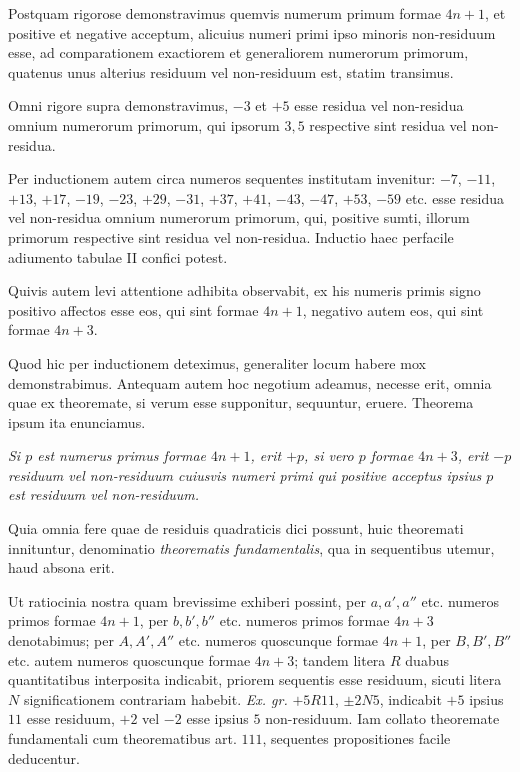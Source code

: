 
Postquam rigorose demonstravimus quemvis numerum primum formae $4n+1$, et positive et negative acceptum, alicuius numeri primi ipso minoris non-residuum esse, ad comparationem exactiorem et generaliorem numerorum primorum, quatenus unus alterius residuum vel non-residuum est, statim transimus.

Omni rigore supra demonstravimus, $-3$ et $+5$ esse residua vel non-residua omnium numerorum primorum, qui ipsorum $3, 5$ respective sint residua vel non-residua.

Per inductionem autem circa numeros sequentes institutam invenitur: $-7$, $-11$, $+13$, $+17$, $-19$, $-23$, $+29$, $-31$, $+37$, $+41$, $-43$, $-47$, $+53$, $-59$ etc. esse residua vel non-residua omnium numerorum primorum, qui, positive sumti, illorum primorum respective sint residua vel non-residua. Inductio haec perfacile adiumento tabulae II confici potest.

Quivis autem levi attentione adhibita observabit, ex his numeris primis signo positivo affectos esse eos, qui sint formae $4n+1$, negativo autem eos, qui sint formae $4n+3$.


Quod hic per inductionem deteximus, generaliter locum habere mox demonstrabimus. Antequam autem hoc negotium adeamus, necesse erit, omnia quae ex theoremate, si verum esse supponitur, sequuntur, eruere. Theorema ipsum ita enunciamus.

\emph{Si $p$ est numerus primus formae $4n+1$, erit $+p$, si vero $p$ formae $4n+3$, erit $-p$ residuum vel non-residuum cuiusvis numeri primi qui positive acceptus ipsius $p$ est residuum vel non-residuum.}

Quia omnia fere quae de residuis quadraticis dici possunt, huic theoremati innituntur, denominatio \emph{theorematis fundamentalis}, qua in sequentibus utemur, haud absona erit.

Ut ratiocinia nostra quam brevissime exhiberi possint, per $a, a', a''$ etc. numeros primos formae $4n+1$, per $b, b', b''$ etc. numeros primos formae $4n+3$ denotabimus; per $A, A', A''$ etc. numeros quoscunque formae $4n+1$, per $B, B', B''$ etc. autem numeros quoscunque formae $4n+3$; tandem litera $R$ duabus quantitatibus interposita indicabit, priorem sequentis esse residuum, sicuti litera $N$ significationem contrariam habebit. \emph{Ex. gr.} $+5R11$, $\pm 2N5$, indicabit $+5$ ipsius $11$ esse residuum, $+2$ vel $-2$ esse ipsius $5$ non-residuum. Iam collato theoremate fundamentali cum theorematibus art. $111$, sequentes propositiones facile deducentur.

